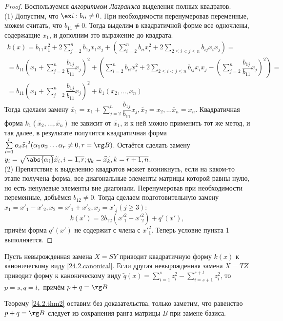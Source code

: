   \begin{proof} Воспользуемся \textit{алгоритмом Лагранжа} выделения полных квадратов.\\
  (1) Допустим,	что $\ex i: b_{ii} \neq 0$. При 	необходимости перенумеровав переменные, можем считать, что $b_{11} \neq 0$. Тогда выделим в квадратичной форме все одночлены, содержащие $x_1$, и дополним это выражение до квадрата:
  \begin{equation*}\begin{array}{crl}
  k(x)=b_{11}x_1^2+2\sum\limits_{j=2}^nb_{1j}x_1x_j+(\sum\limits_{i=2}^nb_{ii}x_i^2+2\sum\limits_{2\le i<j\le n} b_{ij}x_ix_j)=\\
  =b_{11}(x_1+\sum\limits_{j=2}^n\dfrac{b_{1j}}{b_{11}}x_j)^2+(\sum\limits_{i=2}^nb_{ii}x_i^2+2\sum\limits_{2\le i<j\le n} b_{ij}x_ix_j-(\sum\limits_{j=2}^n\dfrac{b_{1j}}{b_{11}}x_j)^2)=\\
  =b_{11}(x_1+\sum\limits_{j=2}^n\dfrac{b_{1j}}{b_{11}}x_j)^2+k_1(x_2,\ldots, x_n)
  \end{array}\end{equation*}
  Тогда сделаем замену $\widetilde{x_1}=x_1+\sum\limits_{j=2}^n\dfrac{b_{1j}}{b_{11}}x_j, \widetilde{x_2}=x_2,\ldots \widetilde{x_n}=x_n$. Квадратичная форма $k_1(\widetilde{x_2},\ldots, \widetilde{x_n})$ не зависит от $\widetilde{x_1}$, и к ней можно применить тот же метод, и так далее, в результате получится квадратичная форма $\sum\limits_{i=1}^r\alpha_i\widetilde{x_i}^2 (\alpha_1\alpha_2\ldots\alpha_r \neq 0, r=\rg B)$. Остаётся сделать замену $y_i=\sqrt{\abs{\alpha_i}}\widetilde{x_i}, i=\overline{1,r}; y_k=\widetilde{x_k}, k=\overline{r+1,n}$.\\
  (2) Препятствие к выделению квадратов может возникнуть, если на каком-то этапе получена форма, все диагональные элементы матрицы которой равны нулю, но есть ненулевые элементы вне диагонали. Перенумеровав при необходимости переменные, добьёмся $b_{12} \neq 0$. Тогда сделаем подготовительную замену $x_1=x'_1-x'_2,x_2=x'_1+x'_2,x_j=x'_j (j \ge 3)$:
  \begin{equation*}
  k(x')=2b_{12}({x'}_1^2-{x'}_2^2)+q'(x'),
  \end{equation*}
  причём форма $q'(x')$ не содержит с члена с ${x'}_1^2$. Теперь условие пункта 1 выполняется.
  \end{proof}
  
  \begin{thm}\label{24.2.thm2}
  Пусть невырожденная замена $X=SY$ приводит квадратичную форму $k(x)$ к каноническому виду \ref{24.2.canonical}. Если другая невырожденная замена $X=TZ$ приводит форму к каноническому виду $\widetilde q(x)=\sum\limits_{i=1}^sz_i^2-\sum\limits_{i=s+1}^{s+t}z_i^2$, то $p=s,q=t,$ причём $p+q=\rg B$
  \end{thm} 
  Теорему \ref{24.2.thm2} оставим без доказательства, только заметим, что равенство $p+q=\rg B$ следует из сохранения ранга матрицы $B$ при замене базиса.